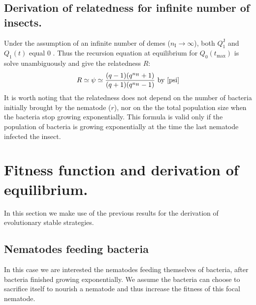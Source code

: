 \documentclass{article}
\newcommand{\nN}{{n_\textrm{H}}}
\newcommand{\nI}{{n_\textrm{I}}}
\begin{document}
\subsection{Derivation of relatedness for infinite number of insects.}
Under the assumption of an infinite number of demes ($\nI \rightarrow \infty$), both $Q_1^{\mathrm{J}}$ and $Q_1(t)$ equal $0$ \cite{rousset2004genetic}. Thus the recursion equation at equilibrium for $Q_0(t_{\mathrm{max}})$ is solve unambiguously and give the relatedness $R$:
 \begin{equation}
 R \simeq \psi \simeq  \dfrac{(q-1)(q^\nN +1)}{(q+1)(q^\nN -1)}  \text{ by } \eqref{psi}
 \end{equation}
 It is worth noting that the relatedness does not depend on the number of bacteria initially brought by the nematode ($r$), nor on the the total population size when the bacteria stop growing exponentially. 
 This formula is valid only if the population of bacteria is growing exponentially at the time the last nematode infected the insect.
\section{Fitness function and derivation of equilibrium.}
 \label{section_fitness}
 In this section we make use of the previous results for the derivation of evolutionary stable strategies.
 \subsection{Nematodes feeding bacteria}
 \label{section_fitness_sub_feeding}
 In this case we are interested the nematodes feeding themselves of bacteria, after bacteria finished growing exponentially. We assume the bacteria can choose to sacrifice itself to nourish a nematode and thus increase the fitness of this focal nematode.
\end{document}
